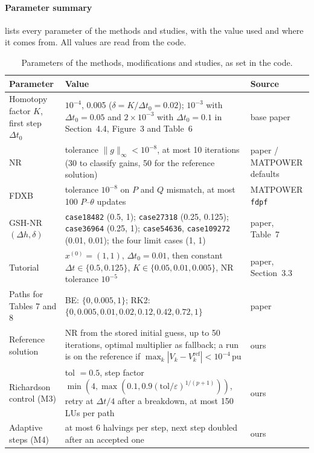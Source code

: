 \documentclass[sigconf,nonacm]{acmart}
\newcommand{\thead}[1]{\textbf{#1}}
\newcommand{\ninf}[1]{\lVert #1\rVert_\infty}
\newcommand{\xo}{x^{(0)}}
\newcommand{\code}[1]{\texttt{#1}}
\begin{document}
\paragraph{Parameter summary}  lists every parameter of the methods and studies, with
the value used and where it comes from. All values are read from the code.

\begin{table}[t]
\centering
\caption{Parameters of the methods, modifications and studies, as set in the code.}
\label{tab:params}
\footnotesize
\begin{tabularx}{\textwidth}{@{}>{\raggedright\arraybackslash}p{4.2cm} >{\raggedright\arraybackslash}X >{\raggedright\arraybackslash}p{4.2cm}@{}}
\toprule
\thead{Parameter} & \thead{Value} & \thead{Source} \\
\midrule
Homotopy factor $K$, first step $\Delta t_0$ & $10^{-4}$, 0.005 ($\delta=K/\Delta t_0=0.02$); $10^{-3}$ with $\Delta t_0=0.05$ and $2\times10^{-3}$ with $\Delta t_0=0.1$ in Section~4.4, Figure~3 and Table~6 & base paper \\
NR & tolerance $\ninf{g}<10^{-8}$, at most 10 iterations (30 to classify gains, 50 for the reference solution) & paper / MATPOWER defaults \\
FDXB & tolerance $10^{-8}$ on $P$ and $Q$ mismatch, at most 100 $P$--$\theta$ updates & MATPOWER \code{fdpf} \\
GSH-NR $(\Delta h,\delta)$ & \code{case18482} (0.5, 1); \code{case27318} (0.25, 0.125); \code{case36964} (0.25, 1); \code{case54636}, \code{case109272} (0.01, 0.01); the four limit cases (1, 1) & paper, Table~7 \\
Tutorial & $\xo=(1,1)$, $\Delta t_0=0.01$, then constant $\Delta t\in\{0.5,0.125\}$, $K\in\{0.05,0.01,0.005\}$, NR tolerance $10^{-5}$ & paper, Section~3.3 \\
Paths for Tables 7 and 8 & BE: $\{0,0.005,1\}$; RK2: $\{0,0.005,0.01,0.02,0.12,0.42,0.72,1\}$ & paper \\
Reference solution & NR from the stored initial guess, up to 50 iterations, optimal multiplier as fallback; a run is on the reference if $\max_k|V_k-V_k^{\mathrm{ref}}|<10^{-4}$\,pu & ours \\
Richardson control (M3) & tol $=0.5$, step factor $\min(4,\max(0.1,0.9(\mathrm{tol}/\varepsilon)^{1/(p+1)}))$, retry at $\Delta t/4$ after a breakdown, at most 150 LUs per path & ours \\
Adaptive steps (M4) & at most 6 halvings per step, next step doubled after an accepted one & ours \\

\end{tabularx}
\end{table}
\end{document}
